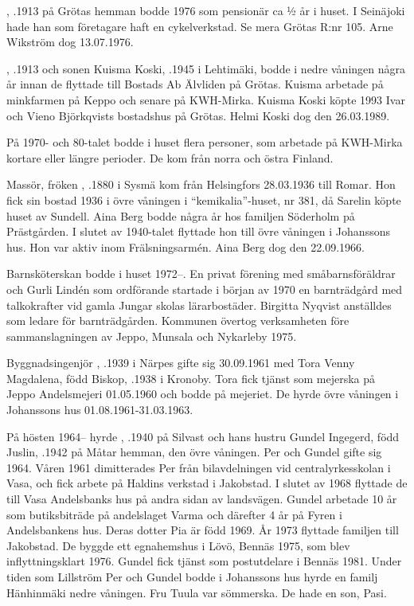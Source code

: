 , .1913 på Grötas hemman bodde 1976 som pensionär ca ½ år i huset. I Seinäjoki hade han som företagare haft en cykelverkstad. Se mera Grötas R:nr 105. Arne Wikström dog 13.07.1976.

, .1913 och sonen Kuisma Koski, .1945 i Lehtimäki,	bodde i nedre våningen några år innan de flyttade till Bostads Ab Älvliden på Grötas. Kuisma arbetade på minkfarmen på Keppo och senare på KWH-Mirka. Kuisma Koski köpte 	1993 Ivar och Vieno Björkqvists bostadshus på Grötas. Helmi Koski dog den 26.03.1989.

På 1970- och 80-talet bodde i huset flera personer, som arbetade på KWH-Mirka kortare eller längre perioder. De kom från norra och östra	Finland.

Massör, fröken , .1880 i Sysmä kom från Helsingfors 28.03.1936 till Romar. Hon fick sin bostad 1936 i övre våningen i ``kemikalia''-huset, nr 381, då Sarelin köpte huset av Sundell. Aina Berg bodde några år hos familjen Söderholm på Prästgården. I slutet av 1940-talet flyttade hon till övre våningen i Johanssons hus. Hon var aktiv inom Frälsningsarmén. Aina Berg dog den 22.09.1966.

Barnsköterskan  bodde i huset 1972--. En privat förening med småbarnsföräldrar och Gurli Lindén som ordförande startade i början av 1970 en barnträdgård med talkokrafter vid gamla Jungar skolas lärarbostäder. Birgitta Nyqvist anställdes som ledare för barnträdgården. Kommunen övertog verksamheten före sammanslagningen av Jeppo, Munsala och Nykarleby 1975.

Byggnadsingenjör , .1939 i Närpes gifte sig 30.09.1961 med Tora Venny Magdalena, född Biskop, .1938 i Kronoby. Tora fick tjänst som mejerska på Jeppo Andelsmejeri 01.05.1960 och bodde på mejeriet. De hyrde övre våningen i Johanssons hus 01.08.1961-31.03.1963.

På hösten 1964-- hyrde , .1940 på Silvast och hans hustru Gundel Ingegerd, född Juslin, .1942 på Måtar hemman, den övre våningen. Per och Gundel gifte sig 1964. Våren 1961 dimitterades Per från bilavdelningen vid centralyrkesskolan i Vasa, och fick arbete på Haldins verkstad i Jakobstad. I slutet av 1968 flyttade de till Vasa Andelsbanks hus på andra sidan av landsvägen. Gundel arbetade 10 år som butiksbiträde på andelslaget Varma och därefter 4 år på Fyren i Andelsbankens hus. Deras dotter Pia är född 1969.  År 1973 flyttade familjen till Jakobstad. De byggde ett egnahemshus i Lövö, Bennäs 1975, som blev inflyttningsklart 1976. Gundel fick tjänst som postutdelare i Bennäs 1981. Under tiden som Lillström Per och Gundel bodde i Johanssons hus hyrde en familj Hänhinmäki nedre våningen. Fru Tuula var sömmerska. De hade en son, Pasi.

